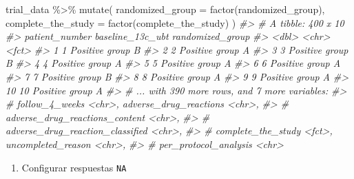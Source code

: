 \documentclass[
]{book}
\newenvironment{Shaded}{\begin{snugshade}}{\end{snugshade}}
\newcommand{\AttributeTok}[1]{\textcolor[rgb]{0.77,0.63,0.00}{#1}}
\newcommand{\CommentTok}[1]{\textcolor[rgb]{0.56,0.35,0.01}{\textit{#1}}}
\newcommand{\FunctionTok}[1]{\textcolor[rgb]{0.00,0.00,0.00}{#1}}
\newcommand{\NormalTok}[1]{#1}
\newcommand{\SpecialCharTok}[1]{\textcolor[rgb]{0.00,0.00,0.00}{#1}}
\providecommand{\tightlist}{%
  \setlength{\itemsep}{0pt}\setlength{\parskip}{0pt}}
\begin{document}
\begin{Shaded}
\begin{Highlighting}[]
\NormalTok{trial\_data }\SpecialCharTok{\%\textgreater{}\%} 
  \FunctionTok{mutate}\NormalTok{(}
    \AttributeTok{randomized\_group =} \FunctionTok{factor}\NormalTok{(randomized\_group),}
    \AttributeTok{complete\_the\_study =} \FunctionTok{factor}\NormalTok{(complete\_the\_study)}
\NormalTok{  )}
\CommentTok{\#\textgreater{} \# A tibble: 400 x 10}
\CommentTok{\#\textgreater{}    patient\_number baseline\_13c\_ubt randomized\_group}
\CommentTok{\#\textgreater{}             \textless{}dbl\textgreater{} \textless{}chr\textgreater{}            \textless{}fct\textgreater{}           }
\CommentTok{\#\textgreater{}  1              1 Positive         group B         }
\CommentTok{\#\textgreater{}  2              2 Positive         group A         }
\CommentTok{\#\textgreater{}  3              3 Positive         group B         }
\CommentTok{\#\textgreater{}  4              4 Positive         group A         }
\CommentTok{\#\textgreater{}  5              5 Positive         group A         }
\CommentTok{\#\textgreater{}  6              6 Positive         group A         }
\CommentTok{\#\textgreater{}  7              7 Positive         group B         }
\CommentTok{\#\textgreater{}  8              8 Positive         group A         }
\CommentTok{\#\textgreater{}  9              9 Positive         group A         }
\CommentTok{\#\textgreater{} 10             10 Positive         group A         }
\CommentTok{\#\textgreater{} \# ... with 390 more rows, and 7 more variables:}
\CommentTok{\#\textgreater{} \#   follow\_4\_weeks \textless{}chr\textgreater{}, adverse\_drug\_reactions \textless{}chr\textgreater{},}
\CommentTok{\#\textgreater{} \#   adverse\_drug\_reactions\_content \textless{}chr\textgreater{},}
\CommentTok{\#\textgreater{} \#   adverse\_drug\_reaction\_classified \textless{}chr\textgreater{},}
\CommentTok{\#\textgreater{} \#   complete\_the\_study \textless{}fct\textgreater{}, uncompleted\_reason \textless{}chr\textgreater{},}
\CommentTok{\#\textgreater{} \#   per\_protocol\_analysis \textless{}chr\textgreater{}}
\end{Highlighting}
\end{Shaded}

\begin{enumerate}
\def\labelenumi{\arabic{enumi}.}
\setcounter{enumi}{2}
\tightlist
\item
  Configurar respuestas \texttt{NA}
\end{enumerate}
\end{document}
